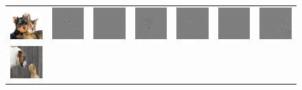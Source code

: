 \begin{figure}
\begin{center}
\begin{tabular}{ccccccc}
\vspace{-2.5pt}
\includegraphics[width=0.14\linewidth,height=0.115\linewidth]{figs/examples/googlenet/oxford/dog-cat3} &
\includegraphics[width=0.14\linewidth,height=0.115\linewidth]{figs/examples/googlenet/oxford/dog-cat3_diff_188} &
\includegraphics[width=0.14\linewidth,height=0.115\linewidth]{figs/examples/googlenet/deconv/dog-cat3_diff_188} &
\includegraphics[width=0.14\linewidth,height=0.115\linewidth]{figs/examples/googlenet/soft/dog-cat3_diff_188} &
\includegraphics[width=0.14\linewidth,height=0.115\linewidth]{figs/examples/googlenet/oxford/dog-cat3_diff_286} &
\includegraphics[width=0.14\linewidth,height=0.115\linewidth]{figs/examples/googlenet/deconv/dog-cat3_diff_286} &
\includegraphics[width=0.14\linewidth,height=0.115\linewidth]{figs/examples/googlenet/soft/dog-cat3_diff_286} \\
\vspace{-2.5pt}
\includegraphics[width=0.14\linewidth,height=0.115\linewidth]{figs/examples/googlenet/oxford/dog-cat4} &

\end{tabular}
\end{center}
\end{figure}
